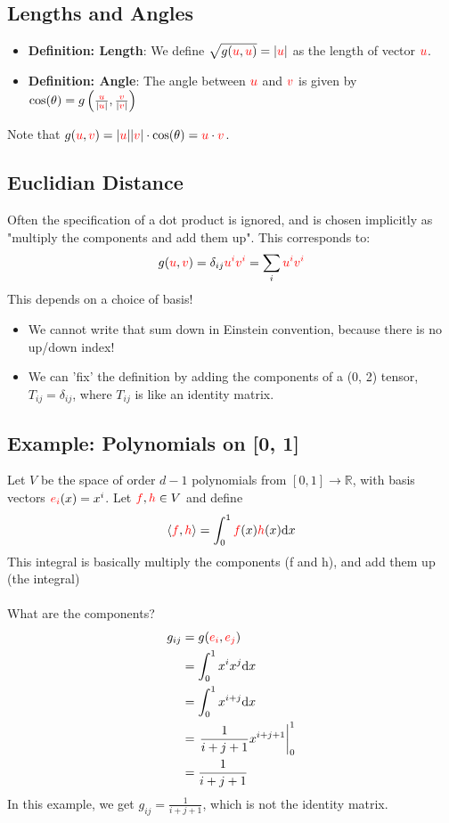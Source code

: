 \documentclass[10pt]{article}
\newcommand{\R}{\mathbb{R}}
\begin{document}
\subsection*{Lengths and Angles}
\begin{itemize}
    \item \textbf{Definition: Length}: We define $\sqrt{g(\textcolor{red}{u}, \textcolor{red}{u})} = |\textcolor{red}{u}|$ as the length of vector $\textcolor{red}{u}$.
    \item \textbf{Definition: Angle}: The angle between $\textcolor{red}{u}$ and $\textcolor{red}{v}$ is given by $\cos(\theta) = g\left(\frac{\textcolor{red}{u}}{|\textcolor{red}{u}|}, \frac{\textcolor{red}{v}}{|\textcolor{red}{v}|}\right)$
\end{itemize}
Note that $g(\textcolor{red}{u}, \textcolor{red}{v}) = |\textcolor{red}{u}||\textcolor{red}{v}| \cdot \cos(\theta) = \textcolor{red}{u} \cdot \textcolor{red}{v}$.

\subsection*{Euclidian Distance}
Often the specification of a dot product is ignored, and is chosen implicitly as "multiply the components and add them up".  This corresponds to:
\[g(\textcolor{red}{u}, \textcolor{red}{v}) = \delta_{ij} \textcolor{red}{u^i v^i} = \sum_i \textcolor{red}{u^i v^i}\]
This depends on a choice of basis!
\begin{itemize}
    \item We cannot write that sum down in Einstein convention, because there is no up/down index!
    \item We can 'fix' the definition by adding the components of a (0, 2) tensor, $T_{ij} = \delta_{ij}$, where $T_{ij}$ is like an identity matrix.
\end{itemize}

\subsection*{Example: Polynomials on [0, 1]}
Let $V$ be the space of order $d - 1$ polynomials from $[0, 1] \rightarrow \R$, with basis vectors $\textcolor{red}{e_i}(x) = x^i$.  Let $\textcolor{red}{f}, \textcolor{red}{h} \in V$ and define
\[\langle \textcolor{red}{f}, \textcolor{red}{h} \rangle = \int_0^1 \textcolor{red}{f}(x) \textcolor{red}{h}(x) \text{d}x\]
This integral is basically multiply the components (f and h), and add them up (the integral)\\\\
What are the components?
\begin{align*}
    g_{ij} &= g(\textcolor{red}{e_i}, \textcolor{red}{e_j})\\
    &= \int_0^1 x^i x^j \text{d}x\\
    &= \int_0^1 x^{i + j} \text{d}x\\
    &= \left.\frac{1}{i + j + 1} x^{i + j + 1} \right|_0^1\\
    &= \frac{1}{i + j + 1}
\end{align*}
In this example, we get $g_{ij} = \frac{1}{i + j + 1}$, which is not the identity matrix.
\end{document}

